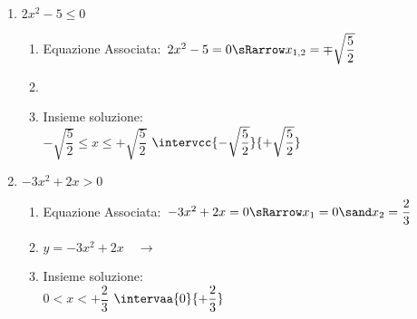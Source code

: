 \begin{esempio}{}{}
\begin{enumerate}
\item \(2x^2-5 \leqslant 0\)

\begin{enumerate}
 \item
  Equazione Associata:~\(2x^2-5=0 \sRarrow 
                        x_{1, 2}= \mp \sqrt{\dfrac{5}{2}}\)
 \item 
  {}
 \item
Insieme soluzione: \\
\insiemesoluzione
  {}
  {\(-\sqrt{\dfrac{5}{2}} \leqslant x \leqslant +\sqrt{\dfrac{5}{2}}\)}
  {\(\intervcc{-\sqrt{\dfrac{5}{2}}}{+\sqrt{\dfrac{5}{2}}}\)}
\end{enumerate}

\item \(-3x^2 + 2x > 0\)

\begin{enumerate}
 \item
  Equazione Associata:~\(-3x^2 + 2x=0 \sRarrow 
                        x_{1}= 0 \sand x_{2}= \dfrac{2}{3}\)
 \item 
 \funzioneassociata
   {\(y = -3x^2 + 2x \quad \rightarrow\)}
   {}
 \item 
Insieme soluzione: \\
 \insiemesoluzione
   {}
   {\(0 < x < +\dfrac{2}{3}\)}
   {\(\intervaa{0}{+\dfrac{2}{3}}\)}
\end{enumerate}

\end{enumerate}
\end{esempio}

